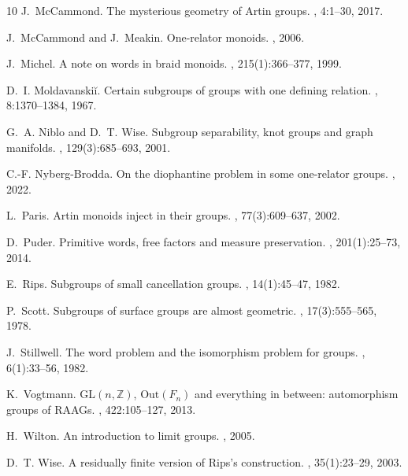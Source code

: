 \documentclass[11pt]{amsart}
\theoremstyle{plain}
\theoremstyle{definition}
\begin{document}
\begin{thebibliography}{10}
J.~McCammond.
\newblock The mysterious geometry of {A}rtin groups.
, 4:1--30, 2017.

J.~McCammond and J.~Meakin.
\newblock One-relator monoids.
,
  2006.

J.~Michel.
\newblock A note on words in braid monoids.
, 215(1):366--377, 1999.

D.~I. Moldavanski\u{i}.
\newblock Certain subgroups of groups with one defining relation.
, 8:1370--1384, 1967.

G.~A. Niblo and D.~T. Wise.
\newblock Subgroup separability, knot groups and graph manifolds.
, 129(3):685--693, 2001.

C.-F. Nyberg-Brodda.
\newblock On the diophantine problem in some one-relator groups.
, 2022.

L.~Paris.
\newblock Artin monoids inject in their groups.
, 77(3):609--637, 2002.

D.~Puder.
\newblock Primitive words, free factors and measure preservation.
, 201(1):25--73, 2014.

E.~Rips.
\newblock Subgroups of small cancellation groups.
, 14(1):45--47, 1982.

P.~Scott.
\newblock Subgroups of surface groups are almost geometric.
, 17(3):555--565, 1978.

J.~Stillwell.
\newblock The word problem and the isomorphism problem for groups.
, 6(1):33--56, 1982.

K.~Vogtmann.
\newblock $\mathrm{GL}(n, \mathbb{Z})$, $\mathrm{Out}(F_n)$ and everything in
  between: automorphism groups of RAAGs.
, 422:105--127, 2013.

H.~Wilton.
\newblock An introduction to limit groups.
, 2005.

D.~T. Wise.
\newblock A residually finite version of {R}ips's construction.
, 35(1):23--29, 2003.

\end{thebibliography}
\end{document}
